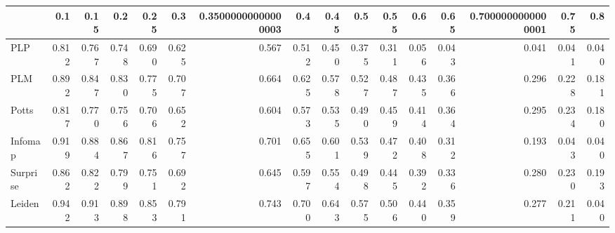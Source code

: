 \begin{tabular}{lrrrrrrrrrrrrrrr}
\toprule
{} &   0.1 &  0.15 &   0.2 &  0.25 &   0.3 & 0.35000000000000003 &   0.4 &  0.45 &   0.5 &  0.55 &   0.6 &  0.65 & 0.7000000000000001 &  0.75 &   0.8 \\
\midrule
PLP      & 0.812 & 0.767 & 0.748 & 0.690 & 0.625 &               0.567 & 0.512 & 0.450 & 0.375 & 0.311 & 0.056 & 0.043 &              0.041 & 0.041 & 0.040 \\
PLM      & 0.892 & 0.847 & 0.830 & 0.775 & 0.707 &               0.664 & 0.625 & 0.578 & 0.527 & 0.487 & 0.435 & 0.366 &              0.296 & 0.228 & 0.181 \\
Potts    & 0.817 & 0.770 & 0.756 & 0.706 & 0.652 &               0.604 & 0.573 & 0.535 & 0.490 & 0.459 & 0.414 & 0.364 &              0.295 & 0.234 & 0.180 \\
Infomap  & 0.919 & 0.884 & 0.867 & 0.816 & 0.757 &               0.701 & 0.655 & 0.601 & 0.539 & 0.472 & 0.408 & 0.312 &              0.193 & 0.043 & 0.040 \\
Surprise & 0.862 & 0.822 & 0.799 & 0.751 & 0.692 &               0.645 & 0.597 & 0.554 & 0.498 & 0.445 & 0.392 & 0.336 &              0.280 & 0.230 & 0.193 \\
Leiden   & 0.942 & 0.913 & 0.898 & 0.853 & 0.791 &               0.743 & 0.700 & 0.643 & 0.575 & 0.506 & 0.440 & 0.359 &              0.277 & 0.211 & 0.040 \\
\bottomrule
\end{tabular}
